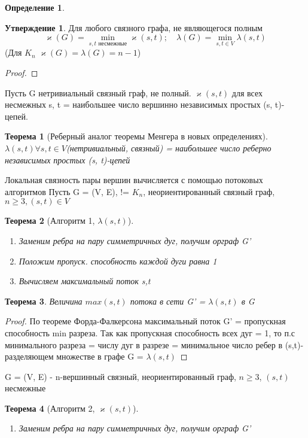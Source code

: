 \documentclass[a4paper]{article}
\newtheorem{theorem}{Теорема}[section]
\theoremstyle{definition}
\newtheorem*{definition}{Определение}
\newtheorem*{statement}{Утверждение}
\theoremstyle{remark}
\begin{document}
\begin{multicols*}{2}
\begin{definition}
    \end{definition}
    \begin{statement}
        Для любого связного графа, не являющегося полным
        $$\varkappa(G)= \min\limits_{s, t\text{ несмежные}} \varkappa(s, t); \quad \lambda(G) = \min\limits_{s, t\in V}\lambda(s, t)$$
        (Для $K_n$ $\varkappa(G) = \lambda(G) = n-1$)
    \end{statement}
    \begin{proof}
    \end{proof}
    Пусть G нетривиальный связный граф, не полный. $\varkappa(s, t)$ для всех несмежных s, t = наибольшее число вершинно независимых простых (s, t)-цепей.
    \begin{theorem}[Реберный аналог теоремы Менгера в новых определениях]
        $\lambda(s, t) \forall s, t\in V$(нетривиальный, связный) = наибольшее число реберно независимых простых (s, t)-цепей
    \end{theorem}
    Локальная связность пары вершин вычисляется с помощью потоковых алгоритмов
    Пусть G = (V, E), != $K_n$, неориентированный связный граф, $n\geq 3, (s, t)\in V$
    \begin{theorem}[Алгоритм 1, $\lambda(s, t)$]
        \begin{enumerate}
            \item Заменим ребра на пару симметричных дуг, получим орграф G' 
            \item Положим пропуск. способность каждой дуги равна 1 
            \item Вычисляем максимальный поток s,t
        \end{enumerate}
    \end{theorem}
    \begin{theorem}
        Величина $max(s,t)$ потока в сети G' = $\lambda(s,t)$ в G
    \end{theorem}
    \begin{proof}
        По теореме Форда-Фалкерсона максимальный поток G' = пропускная способность min разреза. Так как пропускная способность всех дуг = 1, то п.с минимального разреза = числу дуг в разрезе = минимальное число ребер в (s,t)-разделяющем множестве в графе G = $\lambda (s, t)$
    \end{proof}
    G = (V, E) - n-вершинный связный, неориентированный граф, $n\geq 3$, $(s, t)$ несмежные
    \begin{theorem}[Алгоритм 2, $\varkappa(s, t)$]
        \begin{enumerate}
            \item Заменим ребра на пару симметричных дуг, получим орграф G'

\end{enumerate}
\end{theorem}
\end{multicols*}
\end{document}
